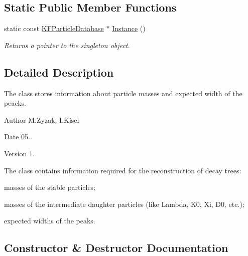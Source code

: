 \subsection*{Static Public Member Functions}
\begin{DoxyCompactItemize}
\item 
static const \hyperlink{classKFParticleDatabase}{K\+F\+Particle\+Database} $\ast$ \hyperlink{classKFParticleDatabase_aa87302fc83afb56bae497e764c65dd8c}{Instance} ()\hypertarget{classKFParticleDatabase_aa87302fc83afb56bae497e764c65dd8c}{}\label{classKFParticleDatabase_aa87302fc83afb56bae497e764c65dd8c}

\begin{DoxyCompactList}\small\item\em Returns a pointer to the singleton object. \end{DoxyCompactList}\end{DoxyCompactItemize}


\subsection{Detailed Description}
The class stores information about particle masses and expected width of the peacks. 

\begin{DoxyAuthor}{Author}
M.\+Zyzak, I.\+Kisel 
\end{DoxyAuthor}
\begin{DoxyDate}{Date}
05.. 
\end{DoxyDate}
\begin{DoxyVersion}{Version}
1.
\end{DoxyVersion}
The class contains information required for the reconstruction of decay trees\+: ~\newline

\begin{DoxyItemize}
\item masses of the stable particles; ~\newline

\item masses of the intermediate daughter particles (like Lambda, K0, Xi, D0, etc.);~\newline

\item expected widths of the peaks. 
\end{DoxyItemize}

\subsection{Constructor \& Destructor Documentation}
